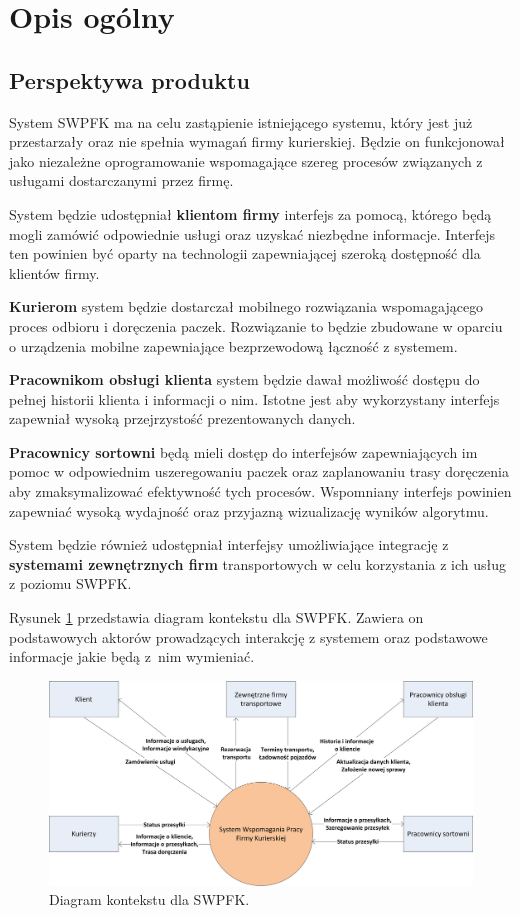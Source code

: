 \section{Opis ogólny}

\subsection{Perspektywa produktu}
System SWPFK ma na celu zastąpienie istniejącego systemu, który jest już przestarzały oraz nie spełnia wymagań firmy kurierskiej. Będzie on funkcjonował jako niezależne oprogramowanie wspomagające szereg procesów związanych z usługami dostarczanymi przez firmę.

System będzie udostępniał \textbf{klientom firmy} interfejs za pomocą, którego będą mogli zamówić odpowiednie usługi oraz uzyskać niezbędne informacje. Interfejs ten powinien być oparty na technologii zapewniającej szeroką dostępność dla klientów firmy.

\textbf{Kurierom} system będzie dostarczał mobilnego rozwiązania wspomagającego proces odbioru i doręczenia paczek. Rozwiązanie to będzie zbudowane w oparciu o urządzenia mobilne zapewniające bezprzewodową łączność z systemem.

\textbf{Pracownikom obsługi klienta} system będzie dawał możliwość dostępu do pełnej historii klienta i informacji o nim. Istotne jest aby wykorzystany interfejs zapewniał wysoką przejrzystość prezentowanych danych.

\textbf{Pracownicy sortowni} będą mieli dostęp do interfejsów zapewniających im pomoc w odpowiednim uszeregowaniu paczek oraz zaplanowaniu trasy doręczenia aby zmaksymalizować efektywność tych procesów. Wspomniany interfejs powinien zapewniać wysoką wydajność oraz przyjazną wizualizację wyników algorytmu.

System będzie również udostępniał interfejsy umożliwiające integrację z \textbf{systemami zewnętrznych firm} transportowych w celu korzystania z ich usług z poziomu SWPFK.

Rysunek \ref{diag:perspektywa} przedstawia diagram kontekstu dla SWPFK. Zawiera on podstawowych aktorów prowadzących interakcję z systemem oraz podstawowe informacje jakie będą z~nim wymieniać.

\begin{figure}[ht]
	\centering
	\includegraphics[width=\textwidth]{img/perspektywa}
	\caption{Diagram kontekstu dla SWPFK.}
	\label{diag:perspektywa}
\end{figure}

